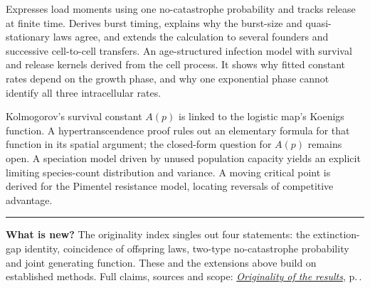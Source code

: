   {}
  {Expresses load moments using one no-catastrophe probability and tracks
   release at finite time. Derives burst timing, explains why the burst-size and
   quasi-stationary laws agree, and extends the calculation to several
   founders and successive cell-to-cell transfers.}%
\hfill
{}
  {}
  {An age-structured infection model with survival and release kernels
   derived from the cell process. It shows why fitted constant rates
   depend on the growth phase, and why one exponential phase cannot
   identify all three intracellular rates.}
\par\vspace{12pt}

  {}
  {Kolmogorov's survival constant $A(p)$ is linked to the logistic map's
   Koenigs function. A hypertranscendence proof rules out an elementary
   formula for that function in its spatial argument; the closed-form
   question for $A(p)$ remains open.}%
\hfill
{}
  {}
  {A speciation model driven by unused population capacity yields an
   explicit limiting species-count distribution and variance. A moving
   critical point is derived for the Pimentel resistance model, locating
   reversals of competitive advantage.}
\par

\vfill
{\color{oirule}\rule{\linewidth}{0.5pt}\par}
\vspace{6pt}
{\fontsize{9}{11.5}\selectfont\color{oisoft}\raggedright
\textbf{What is new?} The originality index singles out four statements:
the extinction-gap identity, coincidence of offspring laws, two-type
no-catastrophe probability and joint generating function. These and the
extensions above build on established methods. Full claims, sources and
scope: \hyperref[oi:details]{\textit{Originality of the results}},
p.\,\pageref{oi:details}.\par}
\endgroup
\clearpage
